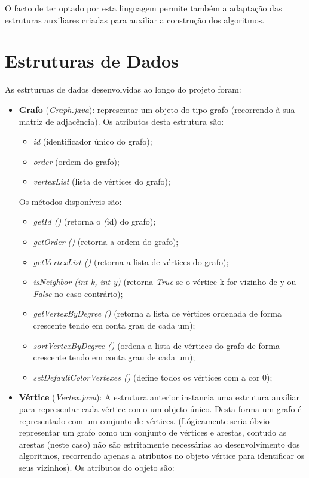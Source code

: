 \documentclass[a4paper,12pt]{report}
\begin{document}
O facto de ter optado por esta linguagem permite também a adaptação das estruturas auxiliares criadas para auxiliar a construção dos algoritmos.

\section{Estruturas de Dados}
As estrturuas de dados desenvolvidas ao longo do projeto foram:
\begin{itemize}
    \item \textbf{Grafo} (\textit{Graph.java}): representar um objeto do tipo grafo (recorrendo à sua matriz de adjacência). Os atributos desta estrutura são:
    \begin{itemize}
        \item \textit{id} (identificador único do grafo);
        \item \textit{order} (ordem do grafo);
        \item \textit{vertexList} (lista de vértices do grafo);
    \end{itemize}
    Os métodos disponíveis são:
    \begin{itemize}
        \item \textit{getId ()} (retorna o \textit(id) do grafo);
        \item \textit{getOrder ()} (retorna a ordem do grafo);
        \item \textit{getVertexList ()} (retorna a lista de vértices do grafo);
        \item \textit{isNeighbor (int k, int y)} (retorna \textit{True} se o vértice k for vizinho de y ou \textit{False} no caso contrário);
        \item \textit{getVertexByDegree ()} (retorna a lista de vértices ordenada de forma crescente tendo em conta grau de cada um);
        \item \textit{sortVertexByDegree ()} (ordena a lista de vértices do grafo de forma crescente tendo em conta grau de cada um);
        \item \textit{setDefaultColorVertexes ()} (define todos os vértices com a cor 0);
    \end{itemize}
    \item \textbf{Vértice} (\textit{Vertex.java}):
    A estrutura anterior instancia uma estrutura auxiliar para representar cada vértice como um objeto único. Desta forma um grafo é representado com um conjunto de vértices.
    (Lógicamente seria óbvio representar um grafo como um conjunto de vértices e arestas, contudo as arestas (neste caso) não são estritamente necessárias ao desenvolvimento dos algoritmos, recorrendo apenas a atributos no objeto vértice para identificar os seus vizinhos). Os atributos do objeto são:

\end{itemize}
\end{document}
